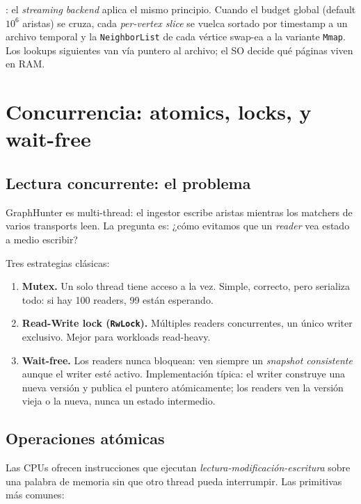 \begin{enelcodigo}
: el \emph{streaming
backend} aplica el mismo principio. Cuando el budget global
(default $10^6$ aristas) se cruza, cada \emph{per-vertex slice}
se vuelca sortado por timestamp a un archivo temporal y la
\texttt{NeighborList} de cada vértice swap-ea a la variante
\texttt{Mmap}. Los lookups siguientes van vía puntero al archivo;
el SO decide qué páginas viven en RAM.
\end{enelcodigo}

\section{Concurrencia: atomics, locks, y wait-free}

\subsection{Lectura concurrente: el problema}

GraphHunter es multi-thread: el ingestor escribe aristas mientras
los matchers de varios transports leen. La pregunta es: ¿cómo
evitamos que un \emph{reader} vea estado a medio escribir?

Tres estrategias clásicas:

\begin{enumerate}
    \item \textbf{Mutex.} Un solo thread tiene acceso a la vez.
    Simple, correcto, pero serializa todo: si hay 100 readers, 99
    están esperando.
    \item \textbf{Read-Write lock (\texttt{RwLock}).} Múltiples
    readers concurrentes, un único writer exclusivo. Mejor para
    workloads read-heavy.
    \item \textbf{Wait-free.} Los readers nunca bloquean: ven
    siempre un \emph{snapshot consistente} aunque el writer esté
    activo. Implementación típica: el writer construye una nueva
    versión y publica el puntero atómicamente; los readers ven la
    versión vieja o la nueva, nunca un estado intermedio.
\end{enumerate}

\subsection{Operaciones atómicas}

Las CPUs ofrecen instrucciones que ejecutan
\emph{lectura-modificación-escritura} sobre una palabra de memoria
sin que otro thread pueda interrumpir. Las primitivas más comunes:


